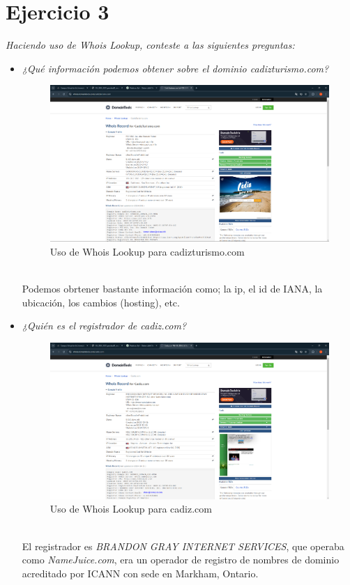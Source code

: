 \documentclass[12pt]{book}
\begin{document}
\section{Ejercicio 3}
\textit{Haciendo uso de Whois Lookup, conteste a las siguientes preguntas:}
\begin{itemize}
    \item \textit{¿Qué información podemos obtener sobre el dominio cadizturismo.com?}\\
        \begin{figure}[h]
            \centering
            \includegraphics[width=0.5\linewidth]{Practica 3y4/images/cadizturismo.png}
            \caption{Uso de Whois Lookup para cadizturismo.com}
            \label{fig:enter-label}
        \end{figure}
        \\
        Podemos obrtener bastante información como; la ip, el id de IANA, la ubicación, los cambios (hosting), etc.
    \item \textit{¿Quién es el registrador de cadiz.com?}\\
        \begin{figure}[h]
            \centering
            \includegraphics[width=0.5\linewidth]{Practica 3y4/images/cadiz.png}
            \caption{Uso de Whois Lookup para cadiz.com}
            \label{fig:enter-label}
        \end{figure}
        \\
        El registrador es \textit{BRANDON GRAY INTERNET SERVICES}, que operaba como \textit{NameJuice.com}, era un operador de registro de nombres de dominio acreditado por ICANN con sede en Markham, Ontario.
\end{itemize}
\newpage
\end{document}
